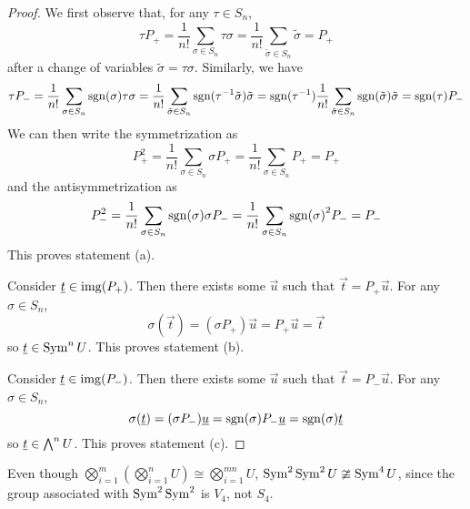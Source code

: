 \begin{proof}
    We first observe that, for any \(\tau \in S_n\),
    \begin{equation*}
        \tau P_+ = \frac{1}{n!} \sum_{\sigma \in S_n} \tau\sigma
        = \frac{1}{n!} \sum_{\tilde{\sigma} \in S_n} \tilde{\sigma}
        = P_+
    \end{equation*}
    after a change of variables \(\tilde{\sigma} = \tau\sigma\).
    Similarly, we have
    \begin{equation*}
        \tau P_- = \frac{1}{n!} \sum_{\sigma \in S_n} \operatorname{sgn}(\sigma) \tau\sigma
        = \frac{1}{n!} \sum_{\tilde{\sigma} \in S_n} \operatorname{sgn}(\tau^{-1}\tilde{\sigma}) \tilde{\sigma}
        = \operatorname{sgn}(\tau^{-1}) \frac{1}{n!} \sum_{\tilde{\sigma} \in S_n} \operatorname{sgn}(\tilde{\sigma}) \tilde{\sigma}
        = \operatorname{sgn}(\tau) P_-
    \end{equation*}
    We can then write the symmetrization as
    \begin{equation*}
        P_+^2 = \frac{1}{n!} \sum_{\sigma \in S_n} \sigma P_+
        = \frac{1}{n!} \sum_{\sigma \in S_n} P_+ = P_+
    \end{equation*}
    and the antisymmetrization as
    \begin{equation*}
        P_-^2 = \frac{1}{n!} \sum_{\sigma \in S_n} \operatorname{sgn}(\sigma) \sigma P_-
        = \frac{1}{n!} \sum_{\sigma \in S_n} {\operatorname{sgn}(\sigma)}^2 P_- = P_-
    \end{equation*}
    This proves statement (a).

    Consider \(\underline{t} \in \operatorname{img}(P_+)\).
    Then there exists some \(\vec{u}\) such that \(\vec{t} = P_+\vec{u}\).
    For any \(\sigma \in S_n\),
    \begin{equation*}
        \sigma(\vec{t}) = (\sigma P_+)\vec{u} = P_+\vec{u} = \vec{t}
    \end{equation*}
    so \(\underline{t} \in \operatorname{Sym}^n U\).
    This proves statement (b).

    Consider \(\underline{t} \in \operatorname{img}(P_-)\).
    Then there exists some \(\vec{u}\) such that \(\vec{t} = P_-\vec{u}\).
    For any \(\sigma \in S_n\),
    \begin{equation*}
        \sigma(\underline{t}) = (\sigma P_-)\underline{u} = \operatorname{sgn}(\sigma) P_-\underline{u} = \operatorname{sgn}(\sigma)\underline{t}
    \end{equation*}
    so \(\underline{t} \in \operatorname{{\bigwedge}}^n U\).
    This proves statement (c).
\end{proof}
\begin{remark}
    Even though \(\bigotimes_{i=1}^m (\bigotimes_{i=1}^n U) \cong \bigotimes_{i=1}^{mn} U\),
    \(\operatorname{Sym}^2 \operatorname{Sym}^2 U \ncong \operatorname{Sym}^4 U\),
    since the group associated with \(\operatorname{Sym}^2 \operatorname{Sym}^2\) is \(V_4\), not \(S_4\).
\end{remark}

